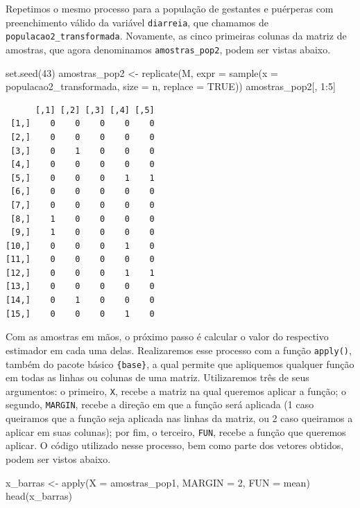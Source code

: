 \documentclass[
  letterpaper,
  DIV=11,
  numbers=noendperiod]{scrreprt}
\newenvironment{Shaded}{\begin{snugshade}}{\end{snugshade}}
\newcommand{\AttributeTok}[1]{\textcolor[rgb]{0.40,0.45,0.13}{#1}}
\newcommand{\ConstantTok}[1]{\textcolor[rgb]{0.56,0.35,0.01}{#1}}
\newcommand{\DecValTok}[1]{\textcolor[rgb]{0.68,0.00,0.00}{#1}}
\newcommand{\FunctionTok}[1]{\textcolor[rgb]{0.28,0.35,0.67}{#1}}
\newcommand{\NormalTok}[1]{\textcolor[rgb]{0.00,0.23,0.31}{#1}}
\newcommand{\OtherTok}[1]{\textcolor[rgb]{0.00,0.23,0.31}{#1}}
\newcommand{\SpecialCharTok}[1]{\textcolor[rgb]{0.37,0.37,0.37}{#1}}
\begin{document}
Repetimos o mesmo processo para a população de gestantes e puérperas com
preenchimento válido da variável \texttt{diarreia}, que chamamos de
\texttt{populacao2\_transformada}. Novamente, as cinco primeiras colunas
da matriz de amostras, que agora denominamos \texttt{amostras\_pop2},
podem ser vistas abaixo.

\begin{Shaded}
\begin{Highlighting}[]
\FunctionTok{set.seed}\NormalTok{(}\DecValTok{43}\NormalTok{)}
\NormalTok{amostras\_pop2 }\OtherTok{\textless{}{-}} \FunctionTok{replicate}\NormalTok{(M, }\AttributeTok{expr =} \FunctionTok{sample}\NormalTok{(}\AttributeTok{x =}\NormalTok{ populacao2\_transformada, }\AttributeTok{size =}\NormalTok{ n, }\AttributeTok{replace =} \ConstantTok{TRUE}\NormalTok{))}
\NormalTok{amostras\_pop2[, }\DecValTok{1}\SpecialCharTok{:}\DecValTok{5}\NormalTok{]}
\end{Highlighting}
\end{Shaded}

\begin{verbatim}
      [,1] [,2] [,3] [,4] [,5]
 [1,]    0    0    0    0    0
 [2,]    0    0    0    0    0
 [3,]    0    1    0    0    0
 [4,]    0    0    0    0    0
 [5,]    0    0    0    1    1
 [6,]    0    0    0    0    0
 [7,]    0    0    0    0    0
 [8,]    1    0    0    0    0
 [9,]    1    0    0    0    0
[10,]    0    0    0    1    0
[11,]    0    0    0    0    0
[12,]    0    0    0    1    1
[13,]    0    0    0    0    0
[14,]    0    1    0    0    0
[15,]    0    0    0    1    0
\end{verbatim}

Com as amostras em mãos, o próximo passo é calcular o valor do
respectivo estimador em cada uma delas. Realizaremos esse processo com a
função \texttt{apply()}, também do pacote básico \texttt{\{base\}}, a
qual permite que apliquemos qualquer função em todas as linhas ou
colunas de uma matriz. Utilizaremos três de seus argumentos: o primeiro,
\texttt{X}, recebe a matriz na qual queremos aplicar a função; o
segundo, \texttt{MARGIN}, recebe a direção em que a função será aplicada
(1 caso queiramos que a função seja aplicada nas linhas da matriz, ou 2
caso queiramos a aplicar em suas colunas); por fim, o terceiro,
\texttt{FUN}, recebe a função que queremos aplicar. O código utilizado
nesse processo, bem como parte dos vetores obtidos, podem ser vistos
abaixo.

\begin{Shaded}
\begin{Highlighting}[]
\NormalTok{x\_barras }\OtherTok{\textless{}{-}} \FunctionTok{apply}\NormalTok{(}\AttributeTok{X =}\NormalTok{ amostras\_pop1, }\AttributeTok{MARGIN =} \DecValTok{2}\NormalTok{, }\AttributeTok{FUN =}\NormalTok{ mean)}
\FunctionTok{head}\NormalTok{(x\_barras)}
\end{Highlighting}
\end{Shaded}
\end{document}
